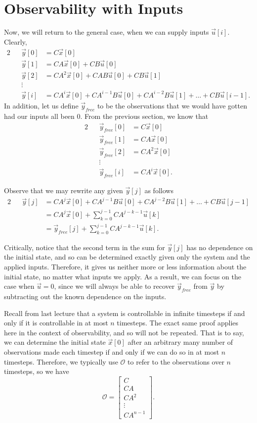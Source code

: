 \documentclass[letterpaper]{article}
\theoremstyle{remark}
\newcommand{\mat}[1]{\ensuremath{\begin{bmatrix}#1\end{bmatrix}}}
\newcommand{\eqn}[1]{\begin{alignat*}{2}#1\end{alignat*}}
\begin{document}
\section{Observability with Inputs}
Now, we will return to the general case, when we can supply inputs $\vec{u}[i]$. Clearly,
\eqn{
    && \vec{y}[0] &= C\vec{x}[0] \\
    && \vec{y}[1] &= CA\vec{x}[0] + CB\vec{u}[0] \\
    && \vec{y}[2] &= CA^2\vec{x}[0] + CAB\vec{u}[0] + CB\vec{u}[1] \\
    && \vdots \\
    && \vec{y}[i] &= CA^i\vec{x}[0] + CA^{i-1}B\vec{u}[0] + CA^{i - 2}B\vec{u}[1] + \ldots + CB\vec{u}[i-1].
}
In addition, let us define $\vec{y}_{free}$ to be the observations that we would have gotten had our inputs all been $0$. From the previous section, we know that
\eqn{
    && \vec{y}_{free}[0] &= C\vec{x}[0] \\
    && \vec{y}_{free}[1] &= CA\vec{x}[0] \\
    && \vec{y}_{free}[2] &= CA^2\vec{x}[0] \\
    && \vdots \\
    && \vec{y}_{free}[i] &= CA^i\vec{x}[0].
}

Observe that we may rewrite any given $\vec{y}[j]$ as follows
\eqn{
    && \vec{y}[j] &= CA^j\vec{x}[0] + CA^{j-1}B\vec{u}[0] + CA^{j-2}B\vec{u}[1] + \ldots + CB\vec{u}[j-1] \\
    &&&= CA^j\vec{x}[0] + \sum_{k=0}^{j-1} CA^{j - k - 1}\vec{u}[k] \\
    &&&= \vec{y}_{free}[j] + \sum_{k=0}^{j-1} CA^{j - k - 1}\vec{u}[k].
}

Critically, notice that the second term in the sum for $\vec{y}[j]$ has no dependence on the initial state, and so can be determined exactly given only the system and the applied inputs. Therefore, it gives us neither more or less information about the initial state, no matter what inputs we apply. As a result, we can focus on the case when $\vec{u} = 0$, since we will always be able to recover $\vec{y}_{free}$ from $\vec{y}$ by subtracting out the known dependence on the inputs.

Recall from last lecture that a system is controllable in infinite timesteps if and only if it is controllable in at most $n$ timesteps. The exact same proof applies here in the context of observability, and so will not be repeated. That is to say, we can determine the initial state $\vec{x}[0]$ after an arbitrary many number of observations made each timestep if and only if we can do so in at most $n$ timesteps. Therefore, we typically use $\mathscr{O}$ to refer to the observations over $n$ timesteps, so we have
\[
    \mathscr{O} = \mat{C \\ CA \\ CA^2 \\ \vdots \\ CA^{n - 1}}.
\]
\end{document}
